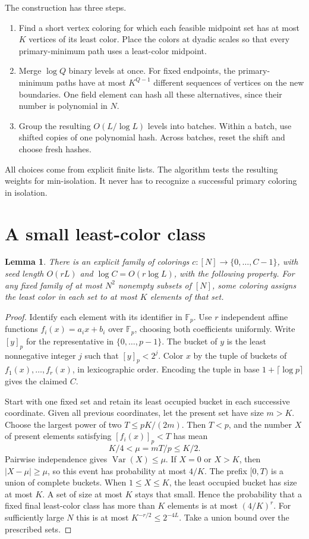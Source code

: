 \documentclass[11pt]{article}
\newtheorem{lemma}[theorem]{Lemma}
\newcommand{\F}{\mathbb F}
\begin{document}
The construction has three steps.
\begin{enumerate}
\item Find a short vertex coloring for which each feasible midpoint set has at most $K$ vertices of its least color. Place the colors at dyadic scales so that every primary-minimum path uses a least-color midpoint.
\item Merge $\log Q$ binary levels at once. For fixed endpoints, the primary-minimum paths have at most $K^{Q-1}$ different sequences of vertices on the new boundaries. One field element can hash all these alternatives, since their number is polynomial in $N$.
\item Group the resulting $O(L/\log L)$ levels into batches. Within a batch, use shifted copies of one polynomial hash. Across batches, reset the shift and choose fresh hashes.
\end{enumerate}
All choices come from explicit finite lists. The algorithm tests the resulting weights for min-isolation. It never has to recognize a successful primary coloring in isolation.

\section{A small least-color class}

\begin{lemma}\label{lem:colors}
There is an explicit family of colorings $c:[N]\to\{0,\ldots,C-1\}$, with seed length $O(rL)$ and $\log C=O(r\log L)$, with the following property. For any fixed family of at most $N^2$ nonempty subsets of $[N]$, some coloring assigns the least color in each set to at most $K$ elements of that set.
\end{lemma}

\begin{proof}
Identify each element with its identifier in $\F_p$. Use $r$ independent affine functions $f_i(x)=a_ix+b_i$ over $\F_p$, choosing both coefficients uniformly. Write $[y]_p$ for the representative in $\{0,\ldots,p-1\}$. The bucket of $y$ is the least nonnegative integer $j$ such that $[y]_p<2^j$. Color $x$ by the tuple of buckets of $f_1(x),\ldots,f_r(x)$, in lexicographic order. Encoding the tuple in base $1+\lceil\log p\rceil$ gives the claimed $C$.

Start with one fixed set and retain its least occupied bucket in each successive coordinate. Given all previous coordinates, let the present set have size $m>K$. Choose the largest power of two $T\le pK/(2m)$. Then $T<p$, and the number $X$ of present elements satisfying $[f_i(x)]_p<T$ has mean
\[
 K/4<\mu=mT/p\le K/2 .
\]
Pairwise independence gives $\operatorname{Var}(X)\le\mu$. If $X=0$ or $X>K$, then $|X-\mu|\ge\mu$, so this event has probability at most $4/K$. The prefix $[0,T)$ is a union of complete buckets. When $1\le X\le K$, the least occupied bucket has size at most $K$. A set of size at most $K$ stays that small. Hence the probability that a fixed final least-color class has more than $K$ elements is at most $(4/K)^r$. For sufficiently large $N$ this is at most $K^{-r/2}\le 2^{-4L}$. Take a union bound over the prescribed sets.
\end{proof}
\end{document}

